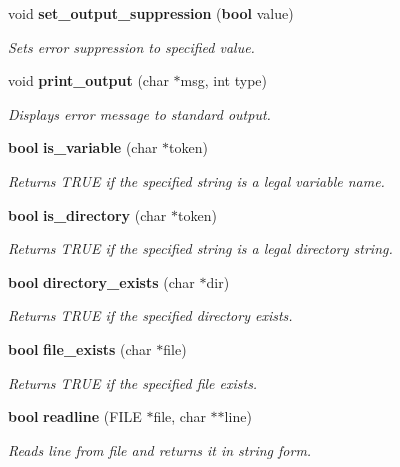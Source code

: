 \begin{CompactItemize}
\item 
void {\bf set\_\-output\_\-suppression} ({\bf bool} value)
\begin{CompactList}\small\item\em Sets error suppression to specified value.\item\end{CompactList}\item 
void {\bf print\_\-output} (char $\ast$msg, int type)
\begin{CompactList}\small\item\em Displays error message to standard output.\item\end{CompactList}\item 
{\bf bool} {\bf is\_\-variable} (char $\ast$token)
\begin{CompactList}\small\item\em Returns TRUE if the specified string is a legal variable name.\item\end{CompactList}\item 
{\bf bool} {\bf is\_\-directory} (char $\ast$token)
\begin{CompactList}\small\item\em Returns TRUE if the specified string is a legal directory string.\item\end{CompactList}\item 
{\bf bool} {\bf directory\_\-exists} (char $\ast$dir)
\begin{CompactList}\small\item\em Returns TRUE if the specified directory exists.\item\end{CompactList}\item 
{\bf bool} {\bf file\_\-exists} (char $\ast$file)
\begin{CompactList}\small\item\em Returns TRUE if the specified file exists.\item\end{CompactList}\item 
{\bf bool} {\bf readline} (FILE $\ast$file, char $\ast$$\ast$line)
\begin{CompactList}\small\item\em Reads line from file and returns it in string form.\item\end{CompactList}\item 
$$
\end{CompactItemize}
